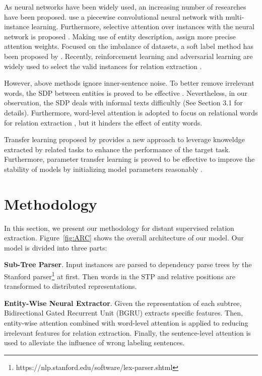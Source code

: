 \documentclass[11pt,a4paper]{article}
\begin{document}
  As neural networks have been widely used, an increasing number of researches have been proposed. \citet{zeng2015distant} use a piecewise convolutional neural network with multi-instance learning. Furthermore, selective attention over instances with the neural network is proposed \citep{lin2016neural}. Making use of entity description, \citet{ji2017distant} assign more precise attention weights. Focused on the imbalance of datasets, a soft label method has been proposed by \citet{liu2017soft}. Recently, reinforcement learning and adversarial learning are widely used to select the valid instances for relation extraction \citep{feng2018reinforcement,P18-1199,P18-1046}.
  
  However, above methods ignore inner-sentence noise. To better remove irrelevant words, the SDP between entities is proved to be effective \citep{de2008stanford,chen2014fast,xu2015classifying,miwa2016end}. Nevertheless, in our observation, the SDP deals with informal texts difficultly (See Section 3.1 for details). Furthermore, word-level attention is adopted to focus on relational words for relation extraction \citep{zhou2016attention}, but it hinders the effect of entity words.
  
  Transfer learning proposed by \citet{pratt1993discriminability} provides a new approach to leverage knoweldge extracted by related tasks to enhance the performance of the target task. Furthermore, parameter transfer learning is proved to be effective to improve the stability of models by initializing model parameters reasonably \citep{pan2010survey,kumagai2016learning}.  

\section{Methodology}
  In this section, we present our methodology for distant supervised relation extraction. Figure~\ref{fig:ARC} shows the overall architecture of our model. Our model is divided into three parts:

  \textbf{Sub-Tree Parser}. Input instances are parsed to dependency parse trees by the Stanford parser\footnote{https://nlp.stanford.edu/software/lex-parser.shtml} \citep{chen2014fast} at first. Then words in the STP and relative positions are transformed to distributed representations.
  
  \textbf{Entity-Wise Neural Extractor}. Given the representation of each subtree, Bidirectional Gated Recurrent Unit (BGRU) extracts specific features. Then, entity-wise attention combined with word-level attention is applied to reducing irrelevant features for relation extraction. Finally, the sentence-level attention is used to alleviate the influence of wrong labeling sentences.
\end{document}
